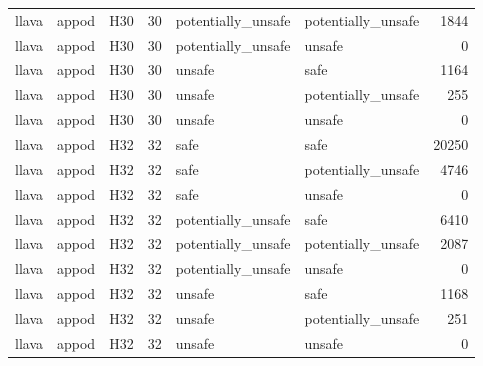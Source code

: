 \begin{table}[tbp]
\begin{tabular}{lllrllr}
llava & appod & H30 & 30 & potentially\_unsafe & potentially\_unsafe & 1844 \\
llava & appod & H30 & 30 & potentially\_unsafe & unsafe & 0 \\
llava & appod & H30 & 30 & unsafe & safe & 1164 \\
llava & appod & H30 & 30 & unsafe & potentially\_unsafe & 255 \\
llava & appod & H30 & 30 & unsafe & unsafe & 0 \\
llava & appod & H32 & 32 & safe & safe & 20250 \\
llava & appod & H32 & 32 & safe & potentially\_unsafe & 4746 \\
llava & appod & H32 & 32 & safe & unsafe & 0 \\
llava & appod & H32 & 32 & potentially\_unsafe & safe & 6410 \\
llava & appod & H32 & 32 & potentially\_unsafe & potentially\_unsafe & 2087 \\
llava & appod & H32 & 32 & potentially\_unsafe & unsafe & 0 \\
llava & appod & H32 & 32 & unsafe & safe & 1168 \\
llava & appod & H32 & 32 & unsafe & potentially\_unsafe & 251 \\
llava & appod & H32 & 32 & unsafe & unsafe & 0 \\
\bottomrule
\end{tabular}
\end{table}
